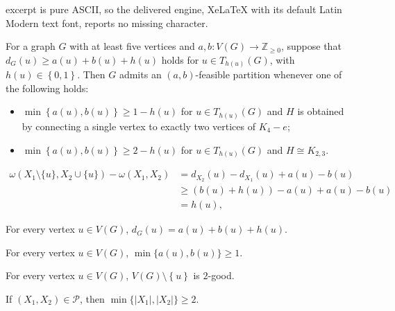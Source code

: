 \documentclass[10pt,a4paper]{amsart}
\begin{document}
excerpt is pure ASCII, so the delivered engine, XeLaTeX with its default Latin Modern text font, reports no missing character.
\begin{theorem}\label{13t}
	For a graph $ G $  with at least five vertices and $ a,b\colon V(G)\longrightarrow \mathbb{Z}_{\ge 0}$, suppose that  $ d_G(u)\ge a(u)+b(u)+h(u)$ holds  for $u\in T_{h(u)}(G)$, with $ h(u)\in \left\lbrace 0,1\right\rbrace$. Then $G$ admits an  $(a,b)$-feasible partition whenever one of the following holds:
	\begin{itemize} \item[(i)] $\min \left\lbrace a(u),b(u)\right\rbrace\ge 1-h(u)$ for $u\in T_{h(u)}(G)$ and $H$ is  obtained   by connecting a single vertex to exactly two vertices of $ K_{4} -e $;
		\item[(ii)] $\min \left\lbrace a(u),b(u)\right\rbrace\ge 2-h(u)$ for $u\in T_{h(u)}(G)$  and  $H\cong K_{2,3}$.
		\end{itemize}
\end{theorem}	

\begin{align}\label{23a}
	\omega(X_1\setminus\{u\},X_2\cup\{u\})-\omega(X_1,X_2)&=d_{X_2}(u)-d_{X_1}(u)+a(u)-b(u)\nonumber\\&\ge (b(u)+h(u))-a(u)+a(u)-b(u)\\&=h(u),\nonumber
\end{align}

	\begin{claim}\label{21c}
		For every vertex $ u\in V(G) $, $ d_G(u)=a(u)+b(u)+h(u) $.
	\end{claim}

\begin{claim}\label{222c}
	For every vertex $ u\in V(G) $, $\min\{a(u),b(u)\}\ge1$.
\end{claim}

\begin{claim}\label{22c}
		For every vertex $ u\in V(G) $, $  V(G)\setminus \left\lbrace u \right\rbrace  $ is  $ 2 $-good.
		\end{claim}

 \begin{claim}\label{28c}
If $ (X_1,X_2)\in\mathcal{P} $, then 	$\min\{ |X_1|,\left|X_2 \right|\} \ge2 $.
\end{claim}
\end{document}
